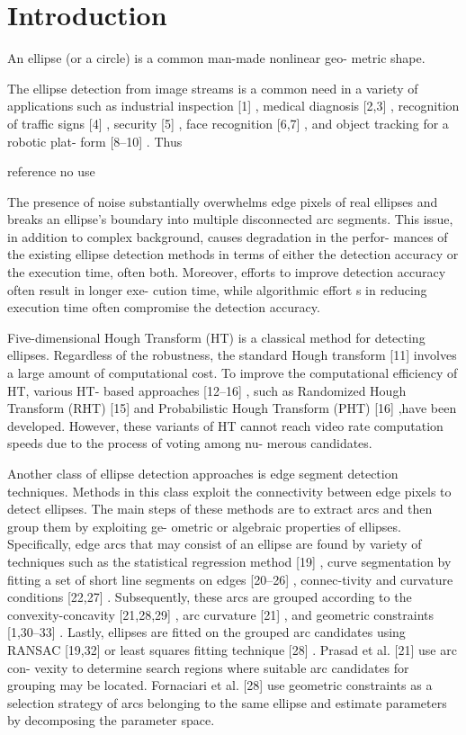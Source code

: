 \documentclass[a4paper]{report}
\begin{document}
\section{Introduction}


An ellipse (or a circle) is a common man-made nonlinear geo- metric shape. 

The ellipse detection from image streams is a common need in a variety of applications such as industrial inspection [1] , medical diagnosis [2,3] , recognition of traffic signs [4] , security [5] , face recognition [6,7] , and object tracking for a robotic plat- form [8–10] . Thus

reference no use

The presence of noise substantially overwhelms edge pixels of real ellipses and breaks an ellipse’s boundary into multiple disconnected arc segments. This issue, in addition to complex background, causes degradation in the perfor- mances of the existing ellipse detection methods in terms of either the detection accuracy or the execution time, often both. Moreover, efforts to improve detection accuracy often result in longer exe- cution time, while algorithmic effort s in reducing execution time often compromise the detection accuracy.

Five-dimensional Hough Transform (HT) is a classical method for detecting ellipses. Regardless of the robustness, the standard Hough transform [11] involves a large amount of computational cost. To improve the computational efficiency of HT, various HT- based approaches [12–16] , such as Randomized Hough Transform (RHT) [15] and Probabilistic Hough Transform (PHT) [16] ,have been developed. However, these variants of HT cannot reach video rate computation speeds due to the process of voting among nu- merous candidates.

Another class of ellipse detection approaches is edge segment detection techniques. Methods in this class exploit the connectivity between edge pixels to detect ellipses. The main steps of these methods are to extract arcs and then group them by exploiting ge- ometric or algebraic properties of ellipses. Specifically, edge arcs that may consist of an ellipse are found by variety of techniques such as the statistical regression method [19] , curve segmentation by fitting a set of short line segments on edges [20–26] , connec-tivity and curvature conditions [22,27] . Subsequently, these arcs are grouped according to the convexity-concavity [21,28,29] , arc curvature [21] , and geometric constraints [1,30–33] . Lastly, ellipses are fitted on the grouped arc candidates using RANSAC [19,32] or least squares fitting technique [28] . Prasad et al. [21] use arc con- vexity to determine search regions where suitable arc candidates for grouping may be located. Fornaciari et al. [28] use geometric constraints as a selection strategy of arcs belonging to the same ellipse and estimate parameters by decomposing the parameter space.
\end{document}
